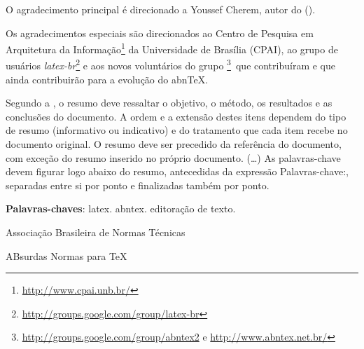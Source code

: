 \documentclass[
12pt,				%
openright,			%
twoside,			%
a4paper,			%
english,			%
french,				%
spanish,			%
brazil,				%
]{abntex2}
\begin{document}
	\begin{agradecimentos}
		O agradecimento principal é direcionado a Youssef Cherem, autor do
		 ().
		
		Os agradecimentos especiais são direcionados ao Centro de Pesquisa em
		Arquitetura da Informação\footnote{\url{http://www.cpai.unb.br/}} da Universidade de
		Brasília (CPAI), ao grupo de usuários
		\emph{latex-br}\footnote{\url{http://groups.google.com/group/latex-br}} e aos
		novos voluntários do grupo
		\emph{\abnTeX}\footnote{\url{http://groups.google.com/group/abntex2} e
			\url{http://www.abntex.net.br/}}~que contribuíram e que ainda
		contribuirão para a evolução do abn\TeX.
		
	\end{agradecimentos}
	
	
	\setlength{\absparsep}{18pt} %
	\begin{resumo}
		Segundo a , o resumo deve ressaltar o
		objetivo, o método, os resultados e as conclusões do documento. A ordem e a extensão
		destes itens dependem do tipo de resumo (informativo ou indicativo) e do
		tratamento que cada item recebe no documento original. O resumo deve ser
		precedido da referência do documento, com exceção do resumo inserido no
		próprio documento. (\ldots) As palavras-chave devem figurar logo abaixo do
		resumo, antecedidas da expressão Palavras-chave:, separadas entre si por
		ponto e finalizadas também por ponto.
		
		\noindent
		\textbf{Palavras-chaves}: latex. abntex. editoração de texto.
	\end{resumo}
	
	\listoffigures*
	\cleardoublepage
	
	\listoftables*
	\cleardoublepage
	
	\begin{siglas}
		\item[ABNT] Associação Brasileira de Normas Técnicas
		\item[abnTeX] ABsurdas Normas para TeX
	\end{siglas}
	
\end{document}
